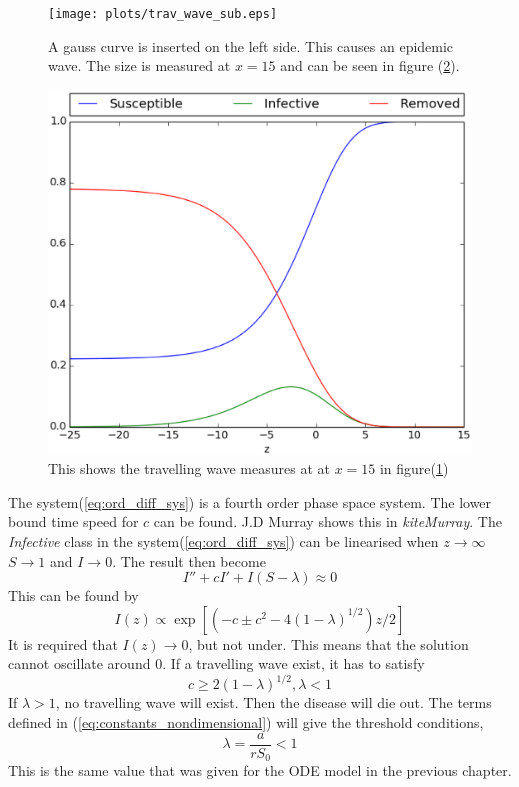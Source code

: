 \documentclass[%
twoside,                 %
final,                   %
10pt]{article}
\begin{document}
\begin{figure}[ht]
  \centerline{\texttt{[image: plots/trav\_wave\_sub.eps]}}
  \caption{
  \label{fig:1D_sub} A gauss curve is inserted on the left side. This causes an epidemic wave. The size is measured at $x=15$ and can be seen in figure (\ref{fig:1D_tw}).
  }
\end{figure}



\begin{figure}[ht]
  \centerline{\includegraphics[width=0.9\linewidth]{plots/epidemic_wave_z_lambda_0_5.eps}}
  \caption{
  \label{fig:1D_tw} This shows the travelling wave measures at at $x=15$ in figure(\ref{fig:1D_sub})
  }
\end{figure}


The system(\ref{eq:ord_diff_sys}) is a fourth order phase space system. The lower bound time speed for $c$ can be found. J.D Murray shows this in \emph{kite{Murray}}. The \emph{Infective} class in the system(\ref{eq:ord_diff_sys}) can be linearised when $z\rightarrow \infty$ $S\rightarrow 1$ and $I \rightarrow 0$. The result then become 
\begin{equation}
	I'' + cI' + I(S-\lambda) \approx 0 
\end{equation}
This can be found by
\begin{equation}
I(z) \varpropto \exp\left[(-c \pm {c^2 -4(1-\lambda)}^{1/2})z/2\right]
\end{equation}
It is required that $I(z)\rightarrow 0$, but not under. This means that the solution cannot oscillate around 0. If a travelling wave exist, it has to satisfy
\begin{equation}
	c \geq 2(1-\lambda)^{1/2}, \lambda < 1
\end{equation}
If $\lambda > 1$, no travelling wave will exist. Then the disease will die out. The terms defined in (\ref{eq:constants_nondimensional}) will give the threshold conditions,
\begin{equation}
	\lambda = \frac{a}{rS_0} < 1
\end{equation}
This is the same value that was given for the ODE model in the previous chapter.
\end{document}
